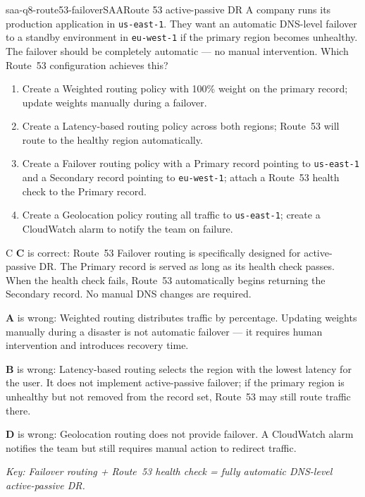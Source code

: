 
\begin{question}{saa-q8-route53-failover}{SAA}{Route 53 active-passive DR}
A company runs its production application in \texttt{us-east-1}. They want an automatic DNS-level failover to a standby environment in \texttt{eu-west-1} if the primary region becomes unhealthy. The failover should be completely automatic --- no manual intervention. Which Route~53 configuration achieves this?

\begin{enumerate}[label=\Alph*.]
  \item Create a Weighted routing policy with 100\% weight on the primary record; update weights manually during a failover.
  \item Create a Latency-based routing policy across both regions; Route~53 will route to the healthy region automatically.
  \item Create a Failover routing policy with a Primary record pointing to \texttt{us-east-1} and a Secondary record pointing to \texttt{eu-west-1}; attach a Route~53 health check to the Primary record.
  \item Create a Geolocation policy routing all traffic to \texttt{us-east-1}; create a CloudWatch alarm to notify the team on failure.
\end{enumerate}
\end{question}

\begin{answer}{C}
\textbf{C} is correct: Route~53 Failover routing is specifically designed for active-passive DR. The Primary record is served as long as its health check passes. When the health check fails, Route~53 automatically begins returning the Secondary record. No manual DNS changes are required.

\textbf{A} is wrong: Weighted routing distributes traffic by percentage. Updating weights manually during a disaster is not automatic failover --- it requires human intervention and introduces recovery time.

\textbf{B} is wrong: Latency-based routing selects the region with the lowest latency for the user. It does not implement active-passive failover; if the primary region is unhealthy but not removed from the record set, Route~53 may still route traffic there.

\textbf{D} is wrong: Geolocation routing does not provide failover. A CloudWatch alarm notifies the team but still requires manual action to redirect traffic.

\textit{Key: Failover routing + Route~53 health check = fully automatic DNS-level active-passive DR.}
\end{answer}

